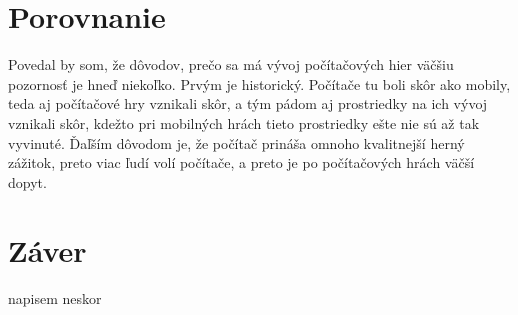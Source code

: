 \documentclass[10pt,twoside,slovak,a4paper]{article}
\begin{document}
\section{Porovnanie} \label{porovnanie}

Povedal by som, že dôvodov, prečo sa má vývoj počítačových hier väčšiu pozornosť je hneď niekoľko. Prvým je historický. Počítače tu boli skôr ako mobily, teda aj počítačové hry vznikali skôr, a tým pádom aj prostriedky na ich vývoj vznikali skôr, kdežto pri mobilných hrách tieto prostriedky ešte nie sú až tak vyvinuté. Ďaľším dôvodom je, že počítač prináša omnoho kvalitnejší herný zážitok, preto viac ľudí volí počítače, a preto je po počítačových hrách väčší dopyt.

\section{Záver} \label{zaver}
napisem neskor


\end{document}
